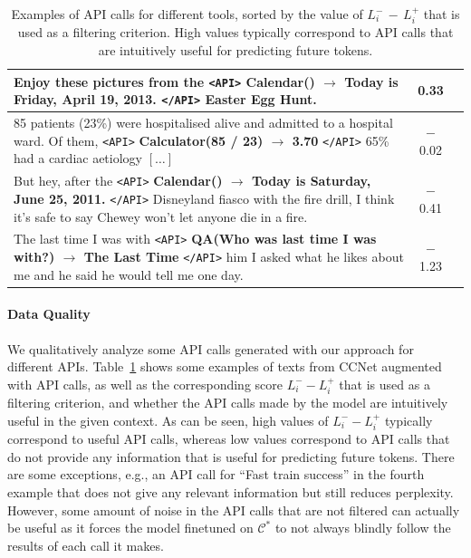 \documentclass[11pt]{article}
\newcommand{\cmark}{\ding{51}}%
\newcommand{\xmark}{\ding{55}}%
\begin{document}
\begin{CJK*}{UTF8}{gbsn}
\begin{table}[ht]
\begin{tabularx}{\linewidth}{Xcc}
    \midrule
    Enjoy these pictures from the  \texttt{<API>} \textbf{Calendar() $\rightarrow$ Today is Friday, April 19, 2013.} \texttt{</API>} Easter Egg Hunt. & 0.33 & \cmark \\    
    \midrule
    85 patients (23\%) were hospitalised alive and admitted to a hospital ward. Of them, \texttt{<API>} \textbf{Calculator(85 / 23) $\rightarrow$ 3.70} \texttt{</API>} 65\% had a cardiac aetiology $\left[\ldots\right]$ & $-$0.02\phantom{$-$} & \xmark \\
    \midrule
    But hey, after the \texttt{<API>} \textbf{Calendar() $\rightarrow$ Today is Saturday, June 25, 2011.} \texttt{</API>} Disneyland fiasco with the fire drill, I think it’s safe to say Chewey won’t let anyone die in a fire. & $-$0.41\phantom{$-$} & \xmark \\ 
    \midrule
    The last time I was with \texttt{<API>} \textbf{QA(Who was last time I was with?) $\rightarrow$ The Last Time} \texttt{</API>} him I asked what he likes about me and he said he would tell me one day. & $-$1.23\phantom{$-$} & \xmark \\
    \bottomrule
    \end{tabularx}
    \caption{Examples of API calls for different tools, sorted by the value of $L_i^-\,{-}\,L_i^+$ that is used as a filtering criterion. High values typically correspond to API calls that are intuitively useful for predicting future tokens.%
    }
    \label{fig:model_outputs}
\end{table}

\paragraph{Data Quality} We qualitatively analyze some API calls generated with our approach for different APIs. Table~\ref{fig:model_outputs} shows some examples of texts from CCNet augmented with API calls, as well as the corresponding score $L_i^- - L_i^+$ that is used as a filtering criterion, and whether the API calls made by the model are intuitively useful in the given context. As can be seen, high values of $L_i^- - L_i^+$ typically correspond to useful API calls, whereas low values correspond to API calls that do not provide any information that is useful for predicting future tokens. There are some exceptions, e.g., an API call for ``Fast train success'' in the fourth example that does not give any relevant information but still reduces perplexity. However, some amount of noise in the API calls that are not filtered can actually be useful as it forces the model finetuned on $\mathcal{C}^*$ to not always blindly follow the results of each call it makes.


\end{CJK*}
\end{document}
